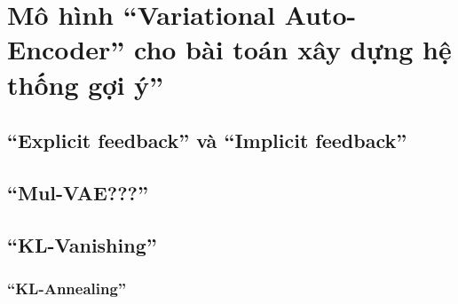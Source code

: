 \chapter{Mô hình ``Variational Auto-Encoder'' cho bài toán xây dựng hệ thống gợi ý''}
\label{Chapter3}

\section{``Explicit feedback'' và ``Implicit feedback''}
\section{``Mul-VAE???''}
\section{``KL-Vanishing''}
    \subsection{``KL-Annealing''}